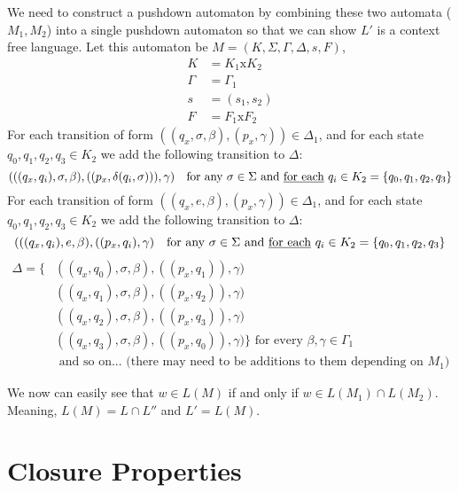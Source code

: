 \documentclass[a4paper,12pt]{article}
\begin{document}
\begin{tcolorbox}
We need to construct a pushdown automaton by combining these two automata ($M_1,M_2$) into a single pushdown automaton so that we can show $L'$ is a context free language. Let this automaton be $M=(K,\Sigma,\Gamma,\Delta,s,F)$, \\
\begin{equation}
\begin{split}
K & = K_1 \text{x} K_2 \\
\Gamma & = \Gamma_1 \\
s & = (s_1,s_2) \\
F & = F_1 \text{x} F_2 
\end{split}
\end{equation} 
For each transition of form $((q_x,\sigma,\beta),(p_x,\gamma))\in \Delta_1$, and for each state $q_0,q_1,q_2,q_3 \in K_2$ we add the following transition to $\Delta$: 
$$(((q_x,q_i), \sigma,\beta),((p_x,\delta(q_i,\sigma))),\gamma)\ \ \text{ for any $\sigma \in \Sigma$ and \underline{for each} $q_i \in K_2=\{q_0,q_1,q_2,q_3\}$}$$
For each transition of form $((q_x,e,\beta),(p_x,\gamma))\in \Delta_1$, and for each  state $q_0,q_1,q_2,q_3 \in K_2$ we add the following transition to $\Delta$: 
$$(((q_x,q_i), e,\beta),((p_x,q_i),\gamma)\ \ \text{ for any $\sigma \in \Sigma$ and \underline{for each} $q_i \in K_2=\{q_0,q_1,q_2,q_3\}$}$$ 
\begin{equation}
\begin{split}
\Delta = \text{\{} &((q_x,q_0), \sigma,\beta),((p_x,q_1)),\gamma) \\
	        &((q_x,q_1), \sigma,\beta),((p_x,q_2)),\gamma) \\
	        &((q_x,q_2), \sigma,\beta),((p_x,q_3)),\gamma) \\
	        &((q_x,q_3), \sigma,\beta),((p_x,q_0)),\gamma) \text{\} } \text{ for every $\beta,\gamma \in \Gamma_1$ } \\
	        &\text{ and so on... (there may need to be additions to them depending on $M_1$)} 
\end{split}
\end{equation} 

We now can easily see that $w\in L(M)$ if and only if $w\in L(M_1)\cap L(M_2)$. \\
Meaning, $L(M)=L\cap L''$ and $L'=L(M)$.
\end{tcolorbox}







\newpage
\section{Closure Properties \hfill {}}
\end{document}
